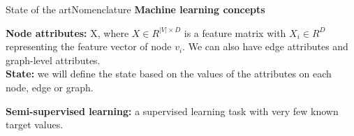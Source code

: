 \documentclass[xcolor=table]{beamer}
\begin{document}


\begin{frame}{State of the art}{Nomenclature}
\textbf{Machine learning concepts}
\vspace{15px}

\textbf{Node attributes:} X, where $X \in R^{|V| \times D}$ is a feature matrix with $X_i \in R^{D}$ representing the feature vector of node $v_i$. %
We can also have edge attributes and graph-level attributes.\\

\textbf{State:} we will define the state based on the values of the attributes on each node, edge or graph.

\textbf{Semi-supervised learning:} a supervised learning task with very few known target values. 



\end{frame}





\end{document}
